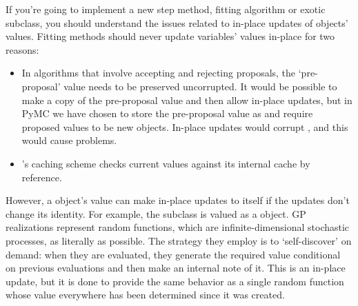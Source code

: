 If you're going to implement a new step method, fitting algorithm or exotic  subclass, you should understand the issues related to in-place updates of  objects' values. Fitting methods should never update variables' values in-place for two reasons:
\begin{itemize}
   \item In algorithms that involve accepting and rejecting proposals, the `pre-proposal' value needs to be preserved uncorrupted. It would be possible to make a copy of the pre-proposal value and then allow in-place updates, but in PyMC we have chosen to store the pre-proposal value as  and require proposed values to be new objects. In-place updates would corrupt , and this would cause problems.
   \item {}'s caching scheme checks current values against its internal cache by reference.
\end{itemize}

However, a  object's value can make in-place updates to itself if the updates don't change its identity. For example, the  subclass  is valued as a  object. GP realizations represent random functions, which are infinite-dimensional stochastic processes, as literally as possible. The strategy they employ is to `self-discover' on demand: when they are evaluated, they generate the required value conditional on previous evaluations and then make an internal note of it. This is an in-place update, but it is done to provide the same behavior as a single random function whose value everywhere has been determined since it was created.